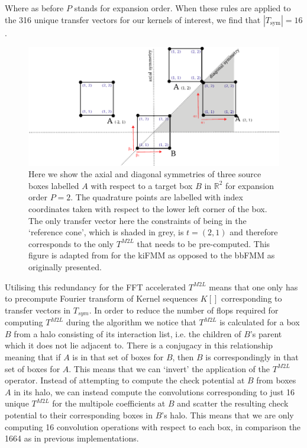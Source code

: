 Where as before $P$ stands for expansion order. When these rules are applied to the 316 unique transfer vectors for our kernels of interest, we find that $|T_{\text{sym}}|  = 16$.

\begin{figure}
    \centering
    \includegraphics[width=\textwidth]{images/ch_3/symmetries.pdf}
    \caption{Here we show the axial and diagonal symmetries of three source boxes labelled $A$ with respect to a target box $B$ in $\mathbb{R}^2$ for expansion order $P=2$. The quadrature points are labelled with index coordinates taken with respect to the lower left corner of the box. The only transfer vector here the constraints of being in the `reference cone', which is shaded in grey, is $t=(2, 1)$ and therefore corresponds to the only $T^{M2L}$ that needs to be pre-computed. This figure is adapted from \cite{messner2012optimized} for the kiFMM as opposed to the bbFMM as originally presented.}
    \label{fig:chpt:3:sec:1:subsec:2:symmetries}
\end{figure}

Utilising this redundancy for the FFT accelerated $T^{M2L}$ means that one only has to precompute Fourier transform of Kernel sequences $K[]$ corresponding to transfer vectors in $T_{\textit{sym}}$. In order to reduce the number of flops required for computing $T^{M2L}$ during the algorithm we notice that $T^{M2L}$ is calculated for a box $B$ from a halo consisting of its interaction list, i.e. the children of $B$'s parent which it does not lie adjacent to. There is a conjugacy in this relationship meaning that if $A$ is in that set of boxes for $B$, then $B$ is correspondingly in that set of boxes for $A$. This means that we can `invert' the application of the $T^{M2L}$ operator. Instead of attempting to compute the check potential at $B$ from boxes $A$ in its halo, we can instead compute the convolutions corresponding to just 16 unique $T^{M2L}$ for the multipole coefficients at $B$ and scatter the resulting check potential to their corresponding boxes in $B$'s halo. This means that we are only computing 16 convolution operations with respect to each box, in comparison the 1664 as in previous implementations.

